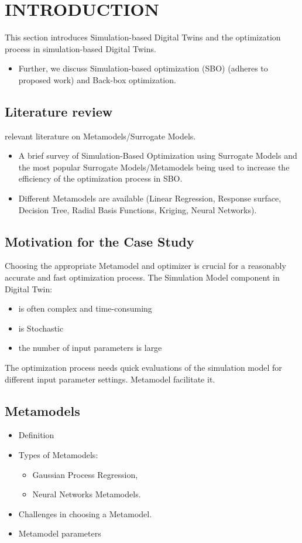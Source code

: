 \section{\uppercase{Introduction}}
\label{sec:introduction}

This section introduces Simulation-based Digital Twins and the optimization process in simulation-based Digital Twins. 
\begin{itemize}
    \item Further, we discuss Simulation-based optimization (SBO) (adheres to proposed work) and Back-box optimization. 
\end{itemize}

\subsection{Literature review}
relevant literature on Metamodels/Surrogate Models.
\begin{itemize}
    \item A brief survey of Simulation-Based Optimization using Surrogate Models and the most popular Surrogate Models/Metamodels being used to increase the efficiency of the optimization process in SBO.
    \item Different Metamodels are available (Linear Regression, Response surface, Decision Tree, Radial Basis Functions, Kriging, Neural Networks).
\end{itemize}

\subsection{Motivation for the Case Study}
Choosing the appropriate Metamodel and optimizer is crucial for a reasonably accurate and fast optimization process.
The Simulation Model component in Digital Twin:
\begin{itemize}
    \item is often complex and time-consuming
    \item is Stochastic
    \item the number of input parameters is large
\end{itemize}
The optimization process needs quick evaluations of the simulation model for different input parameter settings. Metamodel facilitate it.
\subsection{Metamodels}
\begin{itemize}
    \item Definition
    \item Types of Metamodels: 
    \begin{itemize}
        \item Gaussian Process Regression,
        \item Neural Networks Metamodels.
    \end{itemize}
    \item Challenges in choosing a Metamodel.
    \item Metamodel parameters
\end{itemize}

